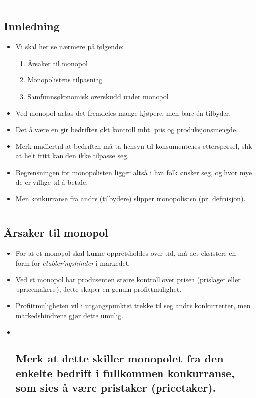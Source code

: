 \documentclass[
  letterpaper,
  DIV=11,
  numbers=noendperiod]{scrartcl}
\providecommand{\tightlist}{%
  \setlength{\itemsep}{0pt}\setlength{\parskip}{0pt}}\usepackage{longtable,booktabs,array}
\begin{document}
\begin{center}\rule{0.5\linewidth}{0.5pt}\end{center}

\subsection{Innledning}\label{innledning-4}

\begin{itemize}
\tightlist
\item
  Vi skal her se nærmere på følgende:

  \begin{enumerate}
  \def\labelenumi{\arabic{enumi}.}
  \tightlist
  \item
    Årsaker til monopol
  \item
    Monopolistens tilpasning
  \item
    Samfunnsøkonomisk overskudd under monopol
  \end{enumerate}
\item
  Ved monopol antas det fremdeles mange kjøpere, men bare én tilbyder.
\item
  Det å være en gir bedriften økt kontroll mht. pris og
  produksjonsmengde.
\item
  Merk imidlertid at bedriften må ta hensyn til konsumentenes
  etterspørsel, slik at helt fritt kan den ikke tilpasse seg.
\item
  Begrensningen for monopolisten ligger altså i hva folk ønsker seg, og
  hvor mye de er villige til å betale.
\item
  Men konkurranse fra andre (tilbydere) slipper monopolisten (pr.
  definisjon).
\end{itemize}

\begin{center}\rule{0.5\linewidth}{0.5pt}\end{center}

\subsection{Årsaker til monopol}\label{uxe5rsaker-til-monopol}

\begin{itemize}
\item
  For at et monopol skal kunne opprettholdes over tid, må det eksistere
  en form for \emph{etableringshinder} i markedet.
\item
  Ved et monopol har produsenten større kontroll over prisen (prislager
  eller «pricemaker»), dette skaper en genuin profittmulighet.
\item
  Profittmuligheten vil i utgangspunktet trekke til seg andre
  konkurrenter, men markedshindrene gjør dette umulig.
\item ~
  \subsection{Merk at dette skiller monopolet fra den enkelte bedrift i
  fullkommen konkurranse, som sies å være pristaker
  (pricetaker).}\label{merk-at-dette-skiller-monopolet-fra-den-enkelte-bedrift-i-fullkommen-konkurranse-som-sies-uxe5-vuxe6re-pristaker-pricetaker.}
\end{itemize}
\end{document}

